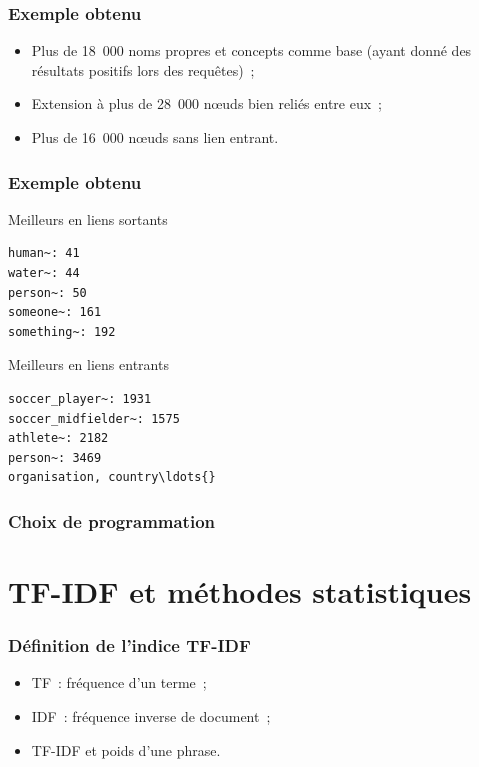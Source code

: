 \documentclass[12pt, handout]{beamer}
\begin{document}
\begin{frame}
  \frametitle{Exemple obtenu}
  
  \begin{itemize}
   \item Plus de 18~000 noms propres et concepts comme base (ayant donné des résultats positifs lors des requêtes)~;
   \item Extension à plus de 28~000 n\oe{}uds bien reliés entre eux~;
   \item Plus de 16~000 n\oe{}uds sans lien entrant.
  \end{itemize}

  
\end{frame}

\begin{frame}[fragile]
 \frametitle{Exemple obtenu}
 
 \begin{block}{Meilleurs en liens sortants}
  \begin{verbatim}
human~: 41
water~: 44
person~: 50
someone~: 161
something~: 192 
  \end{verbatim}
 \end{block}

  \begin{block}{Meilleurs en liens entrants}
    \begin{verbatim}
soccer_player~: 1931
soccer_midfielder~: 1575
athlete~: 2182
person~: 3469
organisation, country\ldots{}
    \end{verbatim}
  \end{block}
\end{frame}


\begin{frame}
 \frametitle{Choix de programmation}
 
 
\end{frame}



\section{TF-IDF et méthodes statistiques}


\begin{frame}
 \frametitle{Définition de l'indice TF-IDF}
 \begin{itemize}
  \item TF~: fréquence d'un terme~;
  \item IDF~: fréquence inverse de document~;
  \item TF-IDF et poids d'une phrase.
 \end{itemize}
 
\end{frame}
\end{document}

